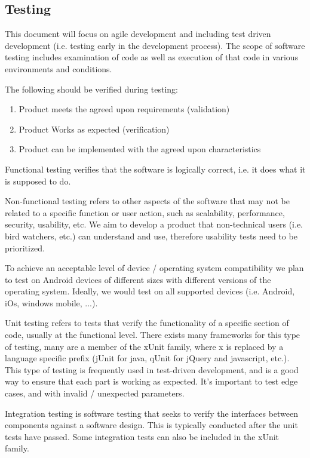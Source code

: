 
\subsection{Testing}
\label{sec:testing}

This document will focus on agile development and including test driven
development (i.e. testing early in the development process).  The scope of
software testing includes examination of code as well as execution of that code
in various environments and conditions.

The following should be verified during testing: \cite{wiki:software-testing}
\begin{enumerate}
	\item Product meets the agreed upon requirements (validation)
	\item Product Works as expected (verification)
	\item Product can be implemented with the agreed upon characteristics
\end{enumerate}

Functional testing verifies that the software is logically correct,
i.e. it does what it is supposed to do.

Non-functional testing refers to other aspects of the software that may not be
related to a specific function or user action, such as scalability,
performance, security, usability, etc.  We aim to develop a product that
non-technical users (i.e.  bird watchers, etc.) can understand and use,
therefore usability tests need to be prioritized.

To achieve an acceptable level of device / operating system compatibility we
plan to test on Android devices of different sizes with different versions of
the operating system.  Ideally, we would test on all supported devices (i.e.
Android, iOs, windows mobile, ...).

Unit testing refers to tests that verify the functionality of a specific
section of code, usually at the functional level. There exists many frameworks for
this type of testing, many are a member of the xUnit family, where x is
replaced by a language specific prefix (jUnit for java, qUnit for jQuery and
javascript, etc.).  This type of testing is frequently used in test-driven
development, and is a good way to ensure that each part is working as expected.
It's important to test edge cases, and with invalid / unexpected parameters.

Integration testing is software testing that seeks to verify the interfaces
between components against a software design. This is typically conducted after
the unit tests have passed. Some integration tests can also be included in the
xUnit family.

